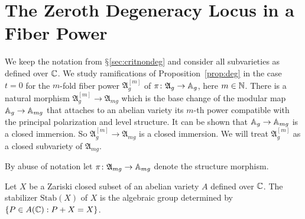 \documentclass[12pt,oneside]{amsart}
\newcommand{\ziyang}[1]{{\color{red} Ziyang: #1}}
\begin{document}


\section{The Zeroth Degeneracy Locus in a Fiber Power}
\label{sec:fiberpower}

We keep the notation from $\mathsection$\ref{sec:critnondeg} and
consider all subvarieties
as defined over ${\mathbb{C}}$. %
We study ramifications
of Proposition~\ref{prop:deg} in the case $t=0$ for the
 $m$-fold fiber power
$\mathfrak{A}_{g}^{[m]}$ of  $\pi\colon\mathfrak{A}_g\rightarrow
{\mathbb{A}}_g$, here $m\in{\mathbb{N}}$. There is a natural morphism
$\mathfrak{A}_{g}^{[m]} \rightarrow \mathfrak{A}_{mg}$ which is the
base change of the modular map ${\mathbb{A}}_{g}\rightarrow{\mathbb{A}}_{mg}$ that
attaches to an abelian variety its $m$-th power compatible  with the
principal polarization and level structure. It can be shown that
${\mathbb{A}}_g\rightarrow{\mathbb{A}}_{mg}$ is a closed immersion. So
$\mathfrak{A}_{g}^{[m]} \rightarrow \mathfrak{A}_{mg}$ is a closed
immersion. We will treat $\mathfrak{A}_{g}^{[m]}$ as a closed
subvariety of $\mathfrak{A}_{mg}$.

By abuse of notation let
$\pi\colon \mathfrak{A}_{mg}\rightarrow {\mathbb{A}}_{mg}$ denote the
structure morphism. 

Let $X$ be a Zariski closed subset of an abelian variety $A$ defined
over ${\mathbb{C}}$. The stabilizer $\mathrm{Stab}(X)$ of $X$ is the algebraic group
determined by $\{P \in A({\mathbb{C}}) : P+X=X\}$.


\end{document}
